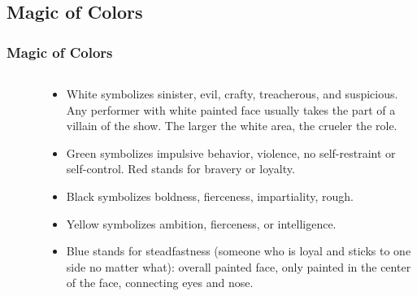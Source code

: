 \documentclass[pdflatex,compress,8pt,
	xcolor={dvipsnames,dvipsnames,svgnames,x11names,table},
	hyperref={	
	breaklinks = true, 
	pdfauthor={Lemenkova Polina}, 
	pdfsubject={Preentation}, 
	pdfcreator={Lemenkova Polina}, 
	pdfproducer={Lemenkova Polina}, 
	colorlinks=true,
	linkcolor=NavyBlue, 
	citecolor=NavyBlue, 
	urlcolor = NavyBlue, 
	breaklinks = true}]{beamer}
\begin{document}
\subsection{Magic of Colors}
\begin{frame}\frametitle{Magic of Colors}
	\begin{minipage}[0.4\textheight]{\textwidth}
		\begin{columns}[T]
			\begin{column}{0.5\textwidth}
			\begin{figure}[H]
				\centering
					\hspace{1mm}
			\end{figure}
			\end{column}
			\begin{column}{0.5\textwidth}
				\vspace{2em}
				\begin{itemize}
					\item \alert{White} symbolizes sinister, evil, crafty, treacherous, and suspicious. Any performer with white painted face usually takes the part of a villain of the show. The larger the white area, the crueler the role.							\item \alert{Green} symbolizes impulsive behavior, violence, no self-restraint or self-control. Red stands for bravery or loyalty.
					\item \alert{Black} symbolizes boldness, fierceness, impartiality, rough.
					\item \alert{Yellow} symbolizes ambition, fierceness, or intelligence. 
					\item \alert{Blue} stands for steadfastness (someone who is loyal and sticks to one side no matter what): overall painted face, only painted in the center of the face, connecting eyes and nose.
				\end{itemize}
			\end{column}
		\end{columns}
	\end{minipage}
\end{frame}
\end{document}
